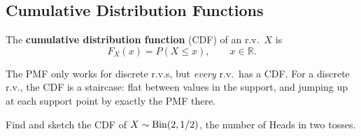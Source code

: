 \bigskip

\subsection{Cumulative Distribution Functions}

\bigskip

\begin{definition}\label{def:cdf}
The \textbf{cumulative distribution function} (CDF) of an r.v.\ $X$ is
\medskip
\[
F_X(x) = P(X \le x), \qquad x \in \mathbb{R}.
\]
\end{definition}

\bigskip

\begin{intuition}
The PMF only works for discrete r.v.s, but \emph{every} r.v.\ has a CDF. For a discrete r.v., the CDF is a staircase: flat between values in the support, and jumping up at each support point by exactly the PMF there.
\end{intuition}

\bigskip

\begin{example}\label{ex:cdfheads}
Find and sketch the CDF of $X \sim \operatorname{Bin}(2, 1/2)$, the number of Heads in two tosses.
\end{example}

\medskip

